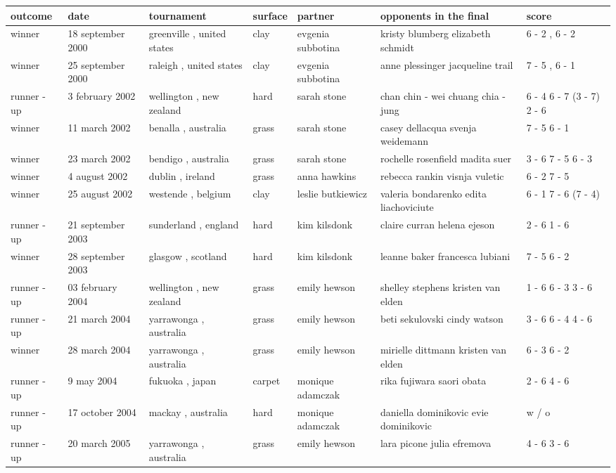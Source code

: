 \documentclass{article}
\begin{document}
\begin{tabular}{lllllll}
\toprule
outcome & date & tournament & surface & partner & opponents in the final & score \\
\midrule
winner & 18 september 2000 & greenville , united states & clay & evgenia subbotina & kristy blumberg elizabeth schmidt & 6 - 2 , 6 - 2 \\
winner & 25 september 2000 & raleigh , united states & clay & evgenia subbotina & anne plessinger jacqueline trail & 7 - 5 , 6 - 1 \\
runner - up & 3 february 2002 & wellington , new zealand & hard & sarah stone & chan chin - wei chuang chia - jung & 6 - 4 6 - 7 (3 - 7) 2 - 6 \\
winner & 11 march 2002 & benalla , australia & grass & sarah stone & casey dellacqua svenja weidemann & 7 - 5 6 - 1 \\
winner & 23 march 2002 & bendigo , australia & grass & sarah stone & rochelle rosenfield madita suer & 3 - 6 7 - 5 6 - 3 \\
winner & 4 august 2002 & dublin , ireland & grass & anna hawkins & rebecca rankin visnja vuletic & 6 - 2 7 - 5 \\
winner & 25 august 2002 & westende , belgium & clay & leslie butkiewicz & valeria bondarenko edita liachoviciute & 6 - 1 7 - 6 (7 - 4) \\
runner - up & 21 september 2003 & sunderland , england & hard & kim kilsdonk & claire curran helena ejeson & 2 - 6 1 - 6 \\
winner & 28 september 2003 & glasgow , scotland & hard & kim kilsdonk & leanne baker francesca lubiani & 7 - 5 6 - 2 \\
runner - up & 03 february 2004 & wellington , new zealand & grass & emily hewson & shelley stephens kristen van elden & 1 - 6 6 - 3 3 - 6 \\
runner - up & 21 march 2004 & yarrawonga , australia & grass & emily hewson & beti sekulovski cindy watson & 3 - 6 6 - 4 4 - 6 \\
winner & 28 march 2004 & yarrawonga , australia & grass & emily hewson & mirielle dittmann kristen van elden & 6 - 3 6 - 2 \\
runner - up & 9 may 2004 & fukuoka , japan & carpet & monique adamczak & rika fujiwara saori obata & 2 - 6 4 - 6 \\
runner - up & 17 october 2004 & mackay , australia & hard & monique adamczak & daniella dominikovic evie dominikovic & w / o \\
runner - up & 20 march 2005 & yarrawonga , australia & grass & emily hewson & lara picone julia efremova & 4 - 6 3 - 6 \\

\end{tabular}
\end{document}
